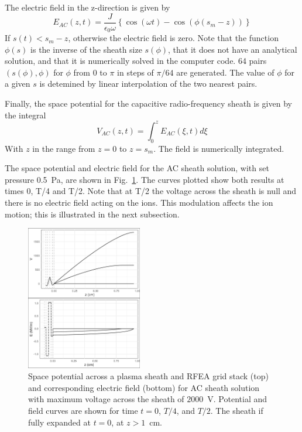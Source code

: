 The electric field in the z-direction is given by 
\begin{equation}
E_{AC}(z,t) = \frac{J}{\epsilon_0 \omega} \left \{ \cos(\omega t) - \cos(\phi(s_m - z)) \right \} 
\end{equation}
If $s(t)<s_m-z$, otherwise the electric field is zero. Note that the function $\phi(s)$ is the inverse of the sheath size $s(\phi)$, that it does not have an analytical solution, and that it is numerically solved in the computer code. 64 pairs $(s(\phi), \phi)$ for $\phi$ from 0 to $\pi$ in steps of $\pi/64$ are generated. The value of $\phi$ for a given $s$ is detemined by linear interpolation of the two nearest pairs.   

Finally, the space potential for the capacitive radio-frequency sheath is given by the integral
\begin{equation}
V_{AC}(z,t) = \int_{0}^{z} E_{AC}(\xi, t) d\xi
\end{equation}
With $z$ in the range from $z=0$ to $z=s_m$. The field is numerically integrated.  

The space potential and electric field for the AC sheath solution, with set pressure 0.5~Pa, are shown in Fig.~\ref{fig:ACpotentialField}. The curves plotted show both results at times 0, T/4 and T/2. Note that at T/2 the voltage across the sheath is null and there is no electric field acting on the ions. This modulation affects the ion motion; this is illustrated in the next subsection. 

\begin{figure}[htbp]
\centering
\includegraphics[width=0.45\textwidth]{Figures/VEz0.5Pa13.56MHz2kVStack2332.jpeg}
\caption{Space potential across a plasma sheath and RFEA grid stack (top) and corresponding electric field (bottom) for AC sheath solution with maximum voltage across the sheath of $2000$~V. Potential and field curves are shown for time $t=0$, $T/4$, and $T/2$. The sheath if fully expanded at $t=0$, at $z>1$~cm.}
\label{fig:ACpotentialField}
\end{figure}


